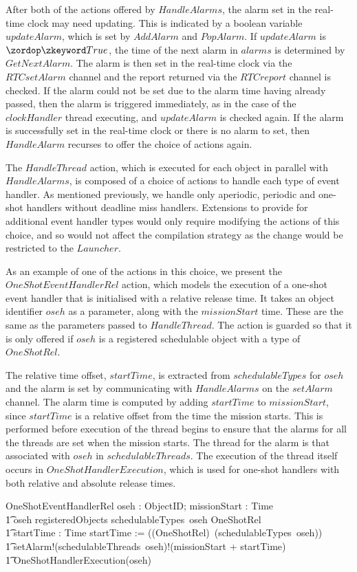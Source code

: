 After both of the actions offered by $HandleAlarms$, the alarm set in
the real-time clock may need updating.
This is indicated by a boolean variable $updateAlarm$, which is set by
$AddAlarm$ and $PopAlarm$.
If $updateAlarm$ is $\true$, the time of the next alarm in $alarms$ is
determined by $GetNextAlarm$.
The alarm is then set in the real-time clock via the $RTCsetAlarm$
channel and the report returned via the $RTCreport$ channel is
checked.
If the alarm could not be set due to the alarm time having already
passed, then the alarm is triggered immediately, as in the case of the
$clockHandler$ thread executing, and $updateAlarm$ is checked again.
If the alarm is successfully set in the real-time clock or there is no
alarm to set, then $HandleAlarm$ recurses to offer the choice of
actions again.

The $HandleThread$ action, which is executed for each object in
parallel with $HandleAlarms$, is composed of a choice of actions to
handle each type of event handler.
As mentioned previously, we handle only aperiodic, periodic and
one-shot handlers without deadline miss handlers.
Extensions to provide for additional event handler types would only
require modifying the actions of this choice, and so would not affect
the compilation strategy as the change would be restricted to the
$Launcher$.

As an example of one of the actions in this choice, we present the
$OneShotEventHandlerRel$ action, which models the execution of a
one-shot event handler that is initialised with a relative release
time.
It takes an object identifier $oseh$ as a parameter, along with the
$missionStart$ time. 
These are the same as the parameters passed to $HandleThread$.
The action is guarded so that it is only offered if $oseh$ is a
registered schedulable object with a type of $OneShotRel$.

The relative time offset, $startTime$, is extracted from
$schedulableTypes$ for $oseh$ and the alarm is set by communicating
with $HandleAlarms$ on the $setAlarm$ channel.
The alarm time is computed by adding $startTime$ to $missionStart$,
since $startTime$ is a relative offset from the time the mission
starts.
This is performed before execution of the thread begins to ensure that
the alarms for all the threads are set when the mission starts.
The thread for the alarm is that associated with $oseh$ in
$schedulableThreads$.
The execution of the thread itself occurs in
$OneShotHandlerExecution$, which is used for one-shot handlers with
both relative and absolute release times.
\begin{circusaction}
  OneShotEventHandlerRel \circdef \circval oseh : ObjectID; \circval missionStart : Time \circspot \\
  \t1 \lcircguard oseh \in registeredObjects \land schedulableTypes~oseh \in \ran OneShotRel \rcircguard \circguard \\
  \t1 \circvar startTime : Time \circspot startTime := ((OneShotRel\inv)~(schedulableTypes~oseh)) \circseq \\
  \t1 setAlarm!(schedulableThreads~oseh)!(missionStart + startTime) \\
  \t1 {} \then OneShotHandlerExecution(oseh)
\end{circusaction}

